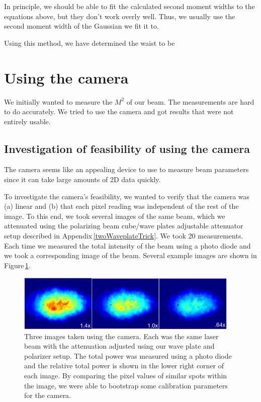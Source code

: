 In principle, we should be able to fit the calculated second moment widths to the equations above, but they don't work overly well. Thus, we usually use the second moment width of the Gaussian we fit it to. 

Using this method, we have determined the waist to be 


\section{Using the camera}
We initially wanted to measure the $M^2$ of our beam. The measurements are hard to do accurately. We tried to use the camera and got results that were not entirely usable.

\subsection{Investigation of feasibility of using the camera}

The camera seems like an appealing device to use to measure beam parameters since it can take large amounts of 2D data quickly.


To investigate the camera's feasibility, we wanted to verify that the camera was (a) linear and (b) that each pixel reading was independent of the rest of the image. To this end, we took several images of the same beam, which we attenuated using the polarizing beam cube/wave plates adjustable attenuator setup described in Appendix\,\ref{twoWaveplateTrick}. We took 20 measurements. Each time we measured the total intensity of the beam using a photo diode and we took a corresponding image of the beam. Several example images are shown in Figure\,\ref{cameraimageexample}.

\begin{figure}
\centerline{
\includegraphics[width=0.95\textwidth]{cameraimage}
}
\caption[Sample camera images]{Three images taken using the camera. Each was the same laser beam with the attenuation adjusted using our wave plate and polarizer setup. The total power was measured using a photo diode and the relative total power is shown in the lower right corner of each image. By comparing the pixel values of similar spots within the image, we were able to bootstrap some calibration parameters for the camera. \label{cameraimageexample}}
\end{figure}

